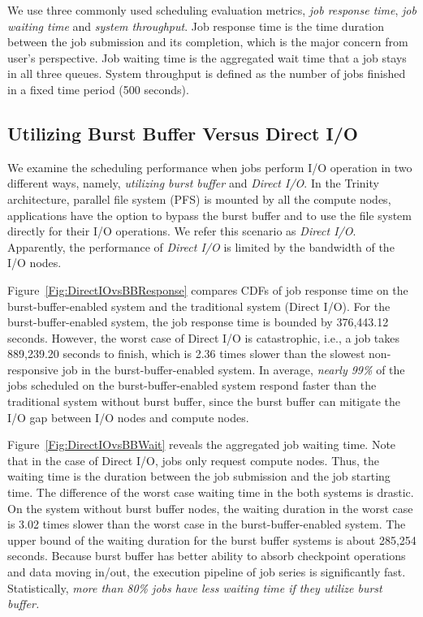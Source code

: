 We use three commonly used scheduling evaluation metrics,
\textit{job response time}, \textit{job waiting time} and \textit{system throughput}.
Job response time is the time duration between the job submission and its completion,
which is the major concern from user's perspective. 
Job waiting time is the aggregated wait time that a job stays in all three queues.
System throughput is defined as the number of jobs finished in
a fixed time period (500 seconds).


\subsection{Utilizing Burst Buffer Versus Direct I/O}
\label{Sec:Sim:DirectIOvsBB}

We examine the scheduling performance when 
jobs perform I/O operation in two different ways, 
namely, \textit{utilizing burst buffer} and \textit{Direct I/O}.
In the Trinity architecture, parallel file system (PFS) is mounted by all the compute nodes,
applications have the option to bypass the burst buffer 
and to use the file system directly for their I/O operations.
We refer this scenario as \textit{Direct I/O}. 
Apparently, the performance of \textit{Direct I/O}
is limited by the bandwidth of the I/O nodes. 

Figure~\ref{Fig:DirectIOvsBBResponse} compares CDFs of job response
time on the burst-buffer-enabled system and the traditional system (Direct I/O).
For the burst-buffer-enabled system, the job response time is bounded by 376,443.12 seconds.
However, the worst case of Direct I/O is catastrophic, 
i.e., a job takes 889,239.20 seconds to finish,
which is 2.36 times slower than the slowest non-responsive job
in the burst-buffer-enabled system.
In average, \textit{nearly 99\%} of the jobs scheduled on the burst-buffer-enabled system
respond faster than the traditional system without burst buffer, since the burst buffer can mitigate the I/O gap between I/O nodes and compute nodes.


Figure~\ref{Fig:DirectIOvsBBWait} reveals the aggregated job waiting time.
Note that in the case of Direct I/O, jobs only request compute nodes.
Thus, the waiting time is the duration between the job submission and the job starting time.
The difference of the worst case waiting time in the both systems is drastic.
On the system without burst buffer nodes, the waiting duration in the worst case is 3.02 times
slower than the worst case in the burst-buffer-enabled system.
The upper bound of the waiting duration for the burst buffer systems is about 285,254 seconds.
Because burst buffer has better ability to absorb checkpoint operations and data moving in/out,
the execution pipeline of job series is significantly fast.
Statistically, \textit{more than 80\% jobs have less waiting time if they utilize burst buffer.}

